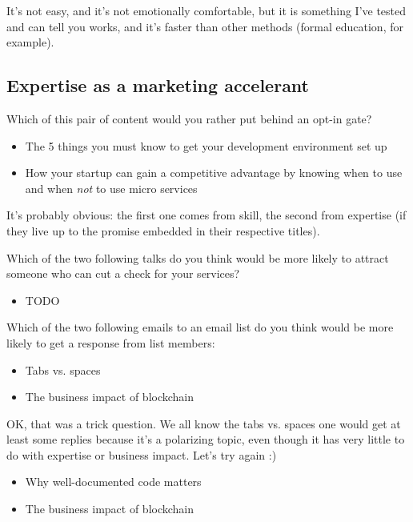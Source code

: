 It's not easy, and it's not emotionally comfortable, but it is something I've tested and can tell you works, and it's faster than other methods (formal education, for example).

\subsection{Expertise as a marketing accelerant}

Which of this pair of content would you rather put behind an opt-in gate?

\begin{itemize}
\item The 5 things you must know to get your development environment set up
\item How your startup can gain a competitive advantage by knowing when to use and when \emph{not} to use micro services
\end{itemize}

It's probably obvious: the first one comes from skill, the second from expertise (if they live up to the promise embedded in their respective titles).

Which of the two following talks do you think would be more likely to attract someone who can cut a check for your services?

\begin{itemize}
\item TODO
\end{itemize}

Which of the two following emails to an email list do you think would be more likely to get a response from list members:

\begin{itemize}
\item Tabs vs. spaces
\item The business impact of blockchain
\end{itemize}

OK, that was a trick question. We all know the tabs vs. spaces one would get at least some replies because it's a polarizing topic, even though it has very little to do with expertise or business impact. Let's try again :)

\begin{itemize}
\item Why well-documented code matters
\item The business impact of blockchain
\end{itemize}

